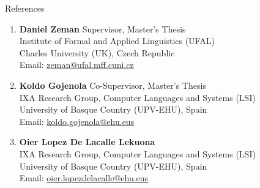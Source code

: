 \documentclass{resume}
\begin{document}
\begin{rSection}{References}

    \begin{enumerate}
        \item \textbf{Daniel Zeman} \hfill Supervisor, Master's Thesis\\
            Institute of Formal and Applied Linguistics (UFAL)\\
            Charles University (UK), Czech Republic\\
            Email: \url{zeman@ufal.mff.cuni.cz}
        
        \item \textbf{Koldo Gojenola} \hfill Co-Supervisor, Master's Thesis\\
            IXA Research Group, Computer Languages and Systems (LSI)\\
            University of Basque Country (UPV-EHU), Spain\\
            Email: \url{koldo.gojenola@ehu.eus}
        
        \item \textbf{Oier Lopez De Lacalle Lekuona}\\
            IXA Research Group, Computer Languages and Systems (LSI)\\
            University of Basque Country (UPV-EHU), Spain\\
            Email: \url{oier.lopezdelacalle@ehu.eus}
    \end{enumerate}

\end{rSection}
\end{document}
